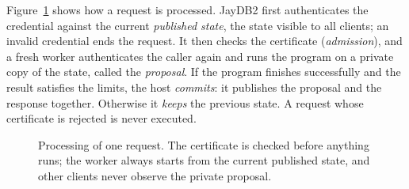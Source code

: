 \documentclass[12pt]{article}
\begin{document}
Figure~\ref{fig:pipeline} shows how a request is processed. JayDB2 first
authenticates the credential against the current \emph{published state}, the
state visible to all clients; an invalid credential ends the request. It then
checks the certificate (\emph{admission}), and a fresh worker authenticates the
caller again and runs the program on a private copy of the state, called the
\emph{proposal}. If the program
finishes successfully and the result satisfies the limits, the host
\emph{commits}: it publishes the proposal and the response together. Otherwise
it \emph{keeps} the previous state. A request whose certificate is rejected is
never executed.

\begin{figure}[H]\centering
{}
\caption{Processing of one request. The certificate is checked before anything
runs; the worker always starts from the current published state, and other
clients never observe the private proposal.}\label{fig:pipeline}
\end{figure}
\end{document}
